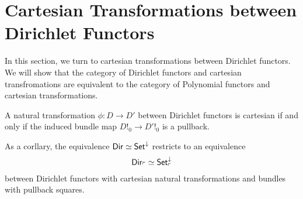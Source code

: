 \section{Cartesian Transformations between Dirichlet Functors}
In this section, we turn to cartesian transformations between Dirichlet
functors. We will show that the category of Dirichlet functors and cartesian
transfromations are equivalent to the category of Polynomial functors and
cartesian transformations.

\begin{prop}
A natural transformation $\phi : D \to D'$ between Dirichlet functors is
cartesian if and only if the induced bundle map $D!_0 \to D'!_0$ is a pullback.

As a corllary, the equivalence $\operatorname{\mathsf{{Dir}}} \simeq \operatorname{\mathsf{{Set}}}^{\mathbin{\downarrow}}$ restricts to an
equivalence
$$\operatorname{\mathsf{{Dir}}}_{\ulcorner} \simeq \operatorname{\mathsf{{Set}}}^{\mathbin{\downarrow}}_{\ulcorner}$$
between Dirichlet functors with cartesian natural transformations and bundles with
pullback squares.
\end{prop}
